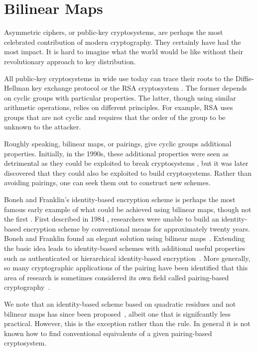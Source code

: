 \chapter{Bilinear Maps}

Asymmetric ciphers, or public-key cryptosystems, are perhaps
the most celebrated contribution of modern cryptography.
They certainly have had the most impact. It is hard to imagine
what the world would be like without their revolutionary
approach to key distribution.

All public-key cryptosystems in wide use today can trace their
roots to the Diffie-Hellman key exchange protocol \cite{diffie76new}
or the RSA cryptosystem \cite{RSA}.
The former depends on cyclic groups
with particular properties. The latter, though
using similar arithmetic operations, relies on different principles.
For example, RSA uses groups that
are not cyclic and requires that the order of the group to be unknown
to the attacker.

Roughly speaking, bilinear maps, or pairings,
give cyclic groups additional properties.
Initially, in the 1990s,
these additional properties were seen as detrimental
as they could be exploited to break cryptosystems \cite{mov, fr, fmr},
but it was later discovered
that they could also be exploited to build cryptosystems.
Rather than avoiding pairings, one can seek them out to construct new
schemes.

Boneh and Franklin's identity-based encryption scheme \cite{bf} is perhaps
the most famous early example of what could be achieved using
bilinear maps, though not the first \cite{sok, j}.
First described in 1984 \cite{shamir1984},
researchers were unable to build an identity-based encryption scheme by
conventional means for approximately
twenty years. 
Boneh and Franklin found an elegant solution using
bilinear maps~\cite{bf}. Extending the basic idea leads to
identity-based schemes with additional useful properties
such as authenticated or hierarchical
identity-based encryption~\cite{l, hl}. More generally,
so many cryptographic applications of the pairing have been identified
that this area of research is sometimes considered its own field called
pairing-based cryptography~\cite{thelounge}.

We note that an identity-based scheme based on quadratic residues
and not bilinear maps has since been proposed~\cite{cocks01, bgh},
albeit one that is signifcantly less practical.
However, this is the exception rather than the rule. In general it is not
known how to find conventional
equivalents of a given pairing-based cryptosystem.

